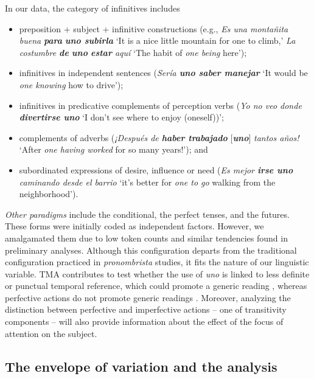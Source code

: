 \documentclass[output=paper]{langscibook}
\begin{document}
In our data, the category of infinitives includes

\begin{itemize}

\item preposition + subject + infinitive constructions (e.g., \textit{Es una montañita buena} \textbf{\textit{para}} \textbf{\textit{uno \textbf{subirla}}} {‘It is a nice little mountain for one to climb,’} \textit{La costumbre \textbf{de} \textbf{uno} \textbf{estar} aquí} ‘The habit of \textit{one being} here’);
\item infinitives in independent sentences (\textit{Sería \textbf{uno saber manejar}} ‘It would be \textit{one knowing} how to drive’); 
\item infinitives in predicative complements of perception verbs (\textit{Yo no veo donde \textbf{divertirse uno}} `I don’t see where to enjoy (oneself))';
\item complements of adverbs (\textit{¡Después de \textbf{haber trabajado}} [\textbf{\textit{uno}}] \textit{tantos años!} {‘After} {\textit{one having worked}} for so many years!’); and
\item subordinated expressions of desire, influence or need (\textit{Es mejor \textbf{irse uno} caminando desde el barrio} ‘it’s better for \textit{one to go} walking from the neighborhood’). 
\end{itemize}


\textit{Other paradigms} include the conditional, the perfect tenses, and the futures. These forms were initially coded as independent factors. However, we amalgamated them due to low token counts and similar tendencies found in preliminary analyses. Although this configuration departs from the traditional configuration practiced in \textit{pronombrista} studies, it fits the nature of our linguistic variable. TMA contributes to test whether the use of \textit{uno} is linked to less definite or punctual temporal reference, which could promote a generic reading \parencites[203]{DeCock2014}[156]{Hernanz1990}, whereas perfective actions do not promote generic readings \citep[355]{Monge2002}. Moreover, analyzing the distinction between perfective and imperfective actions – one of  transitivity components – will also provide information about the effect of the focus of attention on the subject.  

\subsection{The envelope of variation and the analysis}\label{sec:orozco:3.4}
\end{document}
